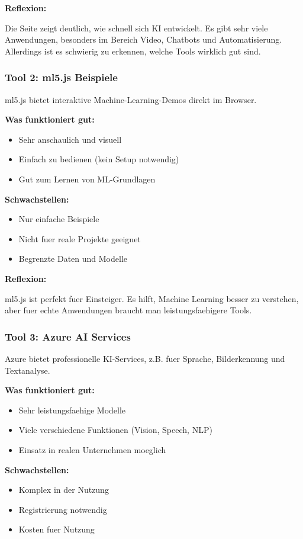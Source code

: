 \documentclass[12pt,a4paper]{article}
\begin{document}
\textbf{Reflexion:}

Die Seite zeigt deutlich, wie schnell sich KI entwickelt.
Es gibt sehr viele Anwendungen, besonders im Bereich Video, Chatbots und Automatisierung.
Allerdings ist es schwierig zu erkennen, welche Tools wirklich gut sind.
\subsubsection*{Tool 2: ml5.js Beispiele}

ml5.js bietet interaktive Machine-Learning-Demos direkt im Browser.

\textbf{Was funktioniert gut:}
\begin{itemize}
    \item Sehr anschaulich und visuell
    \item Einfach zu bedienen (kein Setup notwendig)
    \item Gut zum Lernen von ML-Grundlagen
\end{itemize}

\textbf{Schwachstellen:}
\begin{itemize}
    \item Nur einfache Beispiele
    \item Nicht fuer reale Projekte geeignet
    \item Begrenzte Daten und Modelle
\end{itemize}

\textbf{Reflexion:}

ml5.js ist perfekt fuer Einsteiger. Es hilft, Machine Learning besser zu verstehen,
aber fuer echte Anwendungen braucht man leistungsfaehigere Tools.

\subsubsection*{Tool 3: Azure AI Services}

Azure bietet professionelle KI-Services, z.B. fuer Sprache, Bilderkennung und Textanalyse.

\textbf{Was funktioniert gut:}
\begin{itemize}
    \item Sehr leistungsfaehige Modelle
    \item Viele verschiedene Funktionen (Vision, Speech, NLP)
    \item Einsatz in realen Unternehmen moeglich
\end{itemize}

\textbf{Schwachstellen:}
\begin{itemize}
    \item Komplex in der Nutzung
    \item Registrierung notwendig
    \item Kosten fuer Nutzung
\end{itemize}
\end{document}
